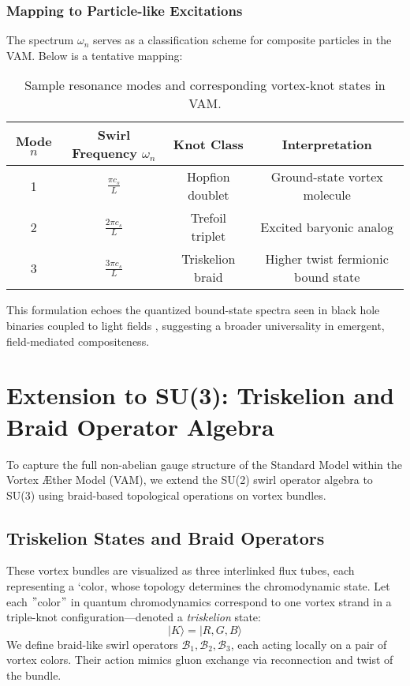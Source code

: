\subsubsection*{Mapping to Particle-like Excitations}

The spectrum \( \omega_n \) serves as a classification scheme for composite particles in the VAM. Below is a tentative mapping:

\begin{table}[H]
    \centering
    \footnotesize
    \renewcommand{\arraystretch}{1.4}
    \begin{tabular}{|c|c|c|c|}
        \hline
        \textbf{Mode} \( n \) & \textbf{Swirl Frequency} \( \omega_n \) & \textbf{Knot Class} & \textbf{Interpretation} \\
        \hline
        1 & \( \frac{\pi c_s}{L} \) & Hopfion doublet & Ground-state vortex molecule \\
        2 & \( \frac{2\pi c_s}{L} \) & Trefoil triplet & Excited baryonic analog \\
        3 & \( \frac{3\pi c_s}{L} \) & Triskelion braid & Higher twist fermionic bound state \\
        \hline
    \end{tabular}
    \caption{Sample resonance modes and corresponding vortex-knot states in VAM.}
\end{table}

This formulation echoes the quantized bound-state spectra seen in black hole binaries coupled to light fields \cite{baumann2023black}, suggesting a broader universality in emergent, field-mediated compositeness.



\section{Extension to SU(3): Triskelion and Braid Operator Algebra}

To capture the full non-abelian gauge structure of the Standard Model within the Vortex Æther Model (VAM), we extend the SU(2) swirl operator algebra to SU(3) using braid-based topological operations on vortex bundles.

\subsection*{Triskelion States and Braid Operators}

These vortex bundles are visualized as three interlinked flux tubes, each representing a ‘color\rqs , whose topology determines the chromodynamic state.
Let each \("\)color\("\) in quantum chromodynamics correspond to one vortex strand in a triple-knot configuration—denoted a \textit{triskelion} state:
\[
|K\rangle = |R, G, B\rangle
\]
We define braid-like swirl operators \( \mathcal{B}_1, \mathcal{B}_2, \mathcal{B}_3 \), each acting locally on a pair of vortex colors. Their action mimics gluon exchange via reconnection and twist of the bundle.

